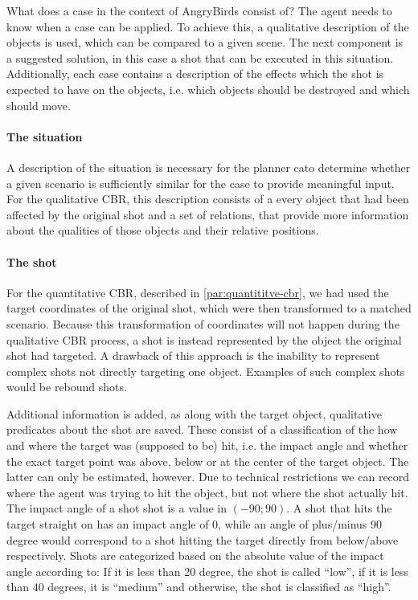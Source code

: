 What does a case in the context of AngryBirds consist of?
The agent needs to know when a case can be applied. To achieve this, a qualitative description of the objects is used, which can be compared to a given scene.
The next component is a suggested solution, in this case a shot that can be executed in this situation.
Additionally, each case contains a description of the effects which the shot is expected to have on the objects, i.e. which objects should be destroyed and which should move.

\paragraph{The situation}
A description of the situation is necessary for the planner cato determine whether a given scenario is sufficiently similar for the case to provide meaningful input.
For the qualitative CBR, this description consists of a every object that had been affected by the original shot and a set of relations, that provide more information about the qualities of those objects and their relative positions.


\paragraph{The shot}
For the quantitative CBR, described in \ref{par:quantititve-cbr}, we had used the target coordinates of the original shot, which were then transformed to a matched scenario.
Because this transformation of coordinates will not happen during the qualitative CBR process, a shot is instead represented by the object the original shot had targeted.
A drawback of this approach is the inability to represent complex shots not directly targeting one object.
Examples of such complex shots would be rebound shots.

Additional information is added, as along with the target object, qualitative predicates about the shot are saved. These consist of a classification of the how and where the target was (supposed to be) hit, i.e. the impact angle and whether the exact target point was above, below or at the center of the target object.
The latter can only be estimated, however. Due to technical restrictions we can record where the agent was trying to hit the object, but not where the shot actually hit.
The impact angle of a shot shot is a value in $(-90;90)$. A shot that hits the target straight on has an impact angle of 0, while an angle of plus/minus 90 degree would correspond to a shot hitting the target directly from below/above respectively. Shots are categorized based on the absolute value of the impact angle according to: If it is less than 20 degree, the shot is called ``low'', if it is less than 40 degrees, it is ``medium'' and otherwise, the shot is classified as ``high''.


